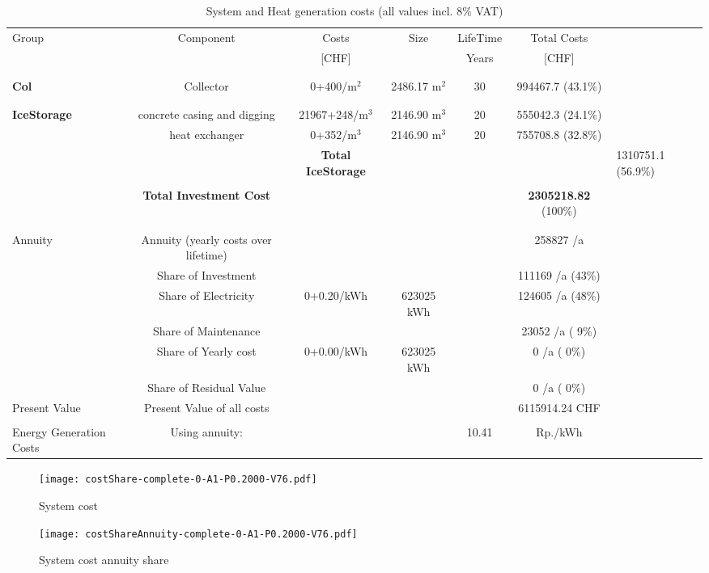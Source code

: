 \documentclass[english]{SPFShortReport}
\begin{document}
\begin{table}[!ht]
\centering
\caption{System and Heat generation costs (all values incl. 8$\%$ VAT) }
\begin{adjustbox}{max width =\textwidth}
\begin{tabular}{l | c c c c c } 
\hline
\hline
Group &Component &Costs &Size &LifeTime &Total Costs \\ 
 & &[CHF] & &Years &[CHF]\\ 
\hline
\\
\hline \\
\textbf{Col} & Collector & 0+400/m$^2$ & 2486.17 m$^2$ & 30 & 994467.7 (43.1\%) \\
\hline \\
\hline \\
\textbf{IceStorage} & concrete casing and digging & 21967+248/m$^3$ & 2146.90 m$^3$ & 20 & 555042.3 (24.1\%) \\
 & heat exchanger & 0+352/m$^3$ & 2146.90 m$^3$ & 20 & 755708.8 (32.8\%) \\
&
 & \textbf{Total IceStorage} & & & & 1310751.1 (56.9\%) \\
\hline \\
 & \textbf{Total Investment Cost} & & & & \textbf{2305218.82} (100\%) \\ 
\hline \\ 
\hline \\ 
Annuity & Annuity (yearly costs over lifetime)  &&& & 258827 /a  \\
 & Share of Investment & &&& 111169 /a (43\%) \\
 & Share of Electricity & 0+0.20/kWh & 623025 kWh &  & 124605 /a (48\%)\\
 & Share of Maintenance & &&& 23052 /a ( 9\%)\\ 
 & Share of Yearly cost & 0+0.00/kWh & 623025 kWh & &  0 /a ( 0\%)\\
 & Share of Residual Value &&& &  0 /a ( 0\%)\\
Present Value  & Present Value of all costs  & &&& 6115914.24 CHF \\
\hline \\ 
 Energy Generation Costs & Using annuity: &&& 10.41 & Rp./kWh \\
\hline
\hline
\end{tabular}
\end{adjustbox}
\label{CostsTable}
\end{table}
\begin{figure}[!htbp]
\begin{center}
\texttt{[image: costShare-complete-0-A1-P0.2000-V76.pdf]}
\caption{System cost}
\label{systemCost}
\end{center}
\end{figure}
\begin{figure}[!htbp]
\begin{center}
\texttt{[image: costShareAnnuity-complete-0-A1-P0.2000-V76.pdf]}
\caption{System cost annuity share}
\label{systemCostannuity}
\end{center}
\end{figure}
\end{document}
